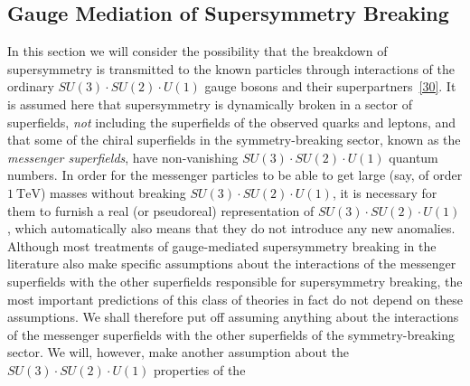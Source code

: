 
\subsection{Gauge Mediation of Supersymmetry Breaking}

In this section we will consider the possibility that the breakdown of
supersymmetry is transmitted to the known particles through interactions
of the ordinary \(SU(3)\mathbin{\cdot}SU(2)\mathbin{\cdot}U(1)\) gauge
bosons and their superpartners~\hyperref[ch28-ref-30]{[30]}. It is assumed
here that supersymmetry is dynamically broken in a sector of superfields,
\emph{not} including the superfields of the observed quarks and leptons,
and that some of the chiral superfields in the symmetry-breaking sector,
known as the \emph{messenger superfields}, have non-vanishing
\(SU(3)\mathbin{\cdot}SU(2)\mathbin{\cdot}U(1)\) quantum numbers. In order
for the messenger particles to be able to get large (say, of order
\(1\ \mathrm{TeV}\)) masses without breaking
\(SU(3)\mathbin{\cdot}SU(2)\mathbin{\cdot}U(1)\), it is necessary for them
to furnish a real (or pseudoreal) representation of
\(SU(3)\mathbin{\cdot}SU(2)\mathbin{\cdot}U(1)\), which automatically also
means that they do not introduce any new anomalies. Although most
treatments of gauge-mediated supersymmetry breaking in the literature also
make specific assumptions about the interactions of the messenger
superfields with the other superfields responsible for supersymmetry
breaking, the most important predictions of this class of theories in fact
do not depend on these assumptions. We shall therefore put off assuming
anything about the interactions of the messenger superfields with the other
superfields of the symmetry-breaking sector. We will, however, make another
assumption about the
\(SU(3)\mathbin{\cdot}SU(2)\mathbin{\cdot}U(1)\) properties of the

